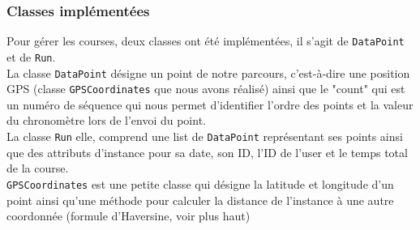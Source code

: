 \documentclass[a4paper,11pt]{article}
\begin{document}
\subsubsection{Classes implémentées}
Pour gérer les courses, deux classes ont été implémentées, il s'agit de \verb+DataPoint+ et de \verb+Run+. \\

La classe \verb+DataPoint+ désigne un point de notre parcours, c'est-à-dire une position GPS (classe \verb+GPSCoordinates+ que nous avons réalisé) ainsi que le "count" qui est un numéro de séquence qui nous permet d'identifier l'ordre des points et la valeur du chronomètre lors de l'envoi du point. \\

La classe \verb+Run+ elle, comprend une list de \verb+DataPoint+ représentant ses points ainsi que des attributs d'instance pour sa date, son ID, l'ID de l'user et le temps total de la course. \\

\verb+GPSCoordinates+ est une petite classe qui désigne la latitude et longitude d'un point ainsi qu'une méthode pour calculer la distance de l'instance à une autre coordonnée (formule d'Haversine, voir plus haut)
\end{document}
